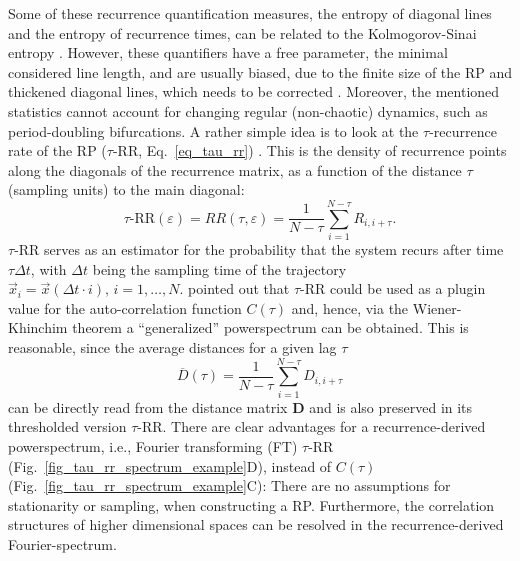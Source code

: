 \documentclass[entropy,article,submit,pdftex,moreauthors]{Definitions/mdpi}
\begin{document}
Some of these recurrence quantification measures, the entropy of diagonal lines and the entropy of 
recurrence times, can be related to the Kolmogorov-Sinai entropy \cite{march2005,baptista2010}. However, these quantifiers have a free parameter, the minimal considered line length, and 
are usually biased, due to the finite size of the RP and thickened diagonal lines, which needs to be corrected \cite{Kraemer2019}. Moreover, the mentioned statistics cannot account for 
changing regular (non-chaotic) dynamics, such as period-doubling bifurcations.
A rather simple idea is to look at the $\tau$-recurrence rate of the RP ($\tau$-RR, Eq.~\ref{eq_tau_rr}) \cite{marwan2002pla,Zbilut2008}.
This is the density of recurrence points along the diagonals of the recurrence matrix, as a function of the distance $\tau$ (sampling units) to the main diagonal:
\begin{equation}\label{eq_tau_rr}
\tau\text{-RR}(\varepsilon) = RR(\tau, \varepsilon) = \frac{1}{N-\tau} \sum_{i=1}^{N-\tau	} R_{i,i+\tau}.
\end{equation}
$\tau$-RR serves as an estimator for the probability that the system recurs after time $\tau \Delta t$, with $\Delta t$ being the sampling time of the trajectory 
$\vec{x}_i = \vec{x}(\Delta t \cdot i),\, i=1,\ldots,N$. 
\citet{Zbilut2008} pointed out that $\tau$-RR could be used as a plugin value for the auto-correlation function $C(\tau)$ and, hence, via the Wiener-Khinchim theorem a 
``generalized'' powerspectrum can be obtained. This is reasonable, since the average distances for a given lag $\tau$ 
\begin{equation}
\overline{D}(\tau) = \frac{1}{N-\tau}\sum_{i=1}^{N-\tau} D_{i, i+\tau}
\end{equation}
can be directly read from the distance matrix $\mathbf{D}$ and is also preserved in its thresholded version $\tau$-RR. There are clear advantages for a recurrence-derived 
powerspectrum, i.e., Fourier transforming (FT) $\tau$-RR (Fig.~\ref{fig_tau_rr_spectrum_example}D), instead 
of $C(\tau)$ (Fig.~\ref{fig_tau_rr_spectrum_example}C): There are no assumptions for stationarity or sampling, when constructing a RP.
Furthermore, the correlation structures of higher dimensional spaces can be resolved in the recurrence-derived Fourier-spectrum.\\
\end{document}
